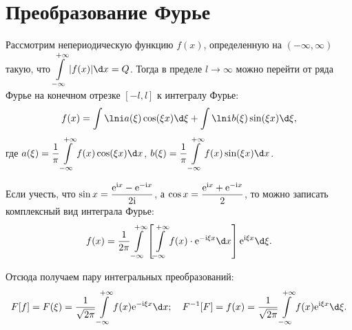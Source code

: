 \section{Преобразование Фурье}
Рассмотрим непериодическую функцию \( f(x) \), определенную на \( (-\infty,
\infty) \) такую, что \( \ds \int\limits_{-\infty}^{+\infty} |f(x)|\d x = Q \).
Тогда в пределе \( l \to \infty \) можно перейти от ряда Фурье на конечном
отрезке \( [-l, l] \) к интегралу Фурье:
\[
    f(x) = \int\lni a(\xi)\cos(\xi x)\d\xi + \int\lni b(\xi)\sin(\xi x)\d\xi,
\]
где \( \ds a(\xi) = \frac{1}{\pi} \int\limits_{-\infty}^{+\infty}
f(x)\cos(\xi x)\d x \), \( \ds b(\xi) = \frac{1}{\pi}
\int\limits_{-\infty}^{+\infty} f(x)\sin(\xi x)\d x \).

Если учесть, что \( \displaystyle \sin x = \frac{\mathrm{e}^{\mathrm{i} x} - \mathrm{e}^{-\mathrm{i} x}}{2\mathrm{i}} \), а
\( \displaystyle \cos x = \frac{\mathrm{e}^{\mathrm{i} x} + \mathrm{e}^{-\mathrm{i} x}}{2} \), то можно записать
комплексный вид интеграла Фурье:
\[
    f(x) = \frac{1}{2\pi}\int\limits_{-\infty}^{+\infty} \left[
    \int\limits_{-\infty}^{+\infty} f(x)\cdot\e^{-\i\xi x}\d x\right]
    \e^{\i\xi x}\d\xi.
\]

Отсюда получаем пару интегральных преобразований:
\[
    F[f] = F(\xi) = \frac{1}{\sqrt{2\pi}}\int\limits_{-\infty}^{+\infty} f(x)
    \e^{-\i\xi x}\d x; \quad
    F^{-1}[F] = f(x) = \frac{1}{\sqrt{2\pi}}\int\limits_{-\infty}^{+\infty} f(x)
    \e^{\i\xi x}\d\xi.
\]
\newpage
